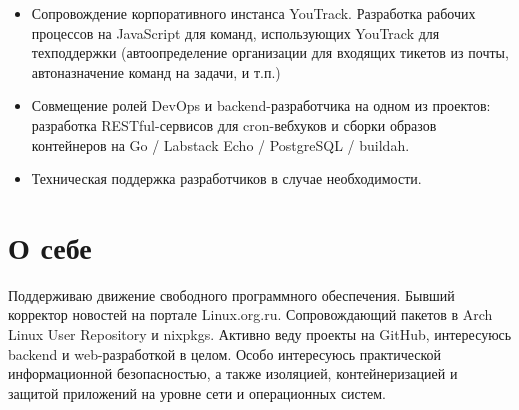 \documentclass[10pt,a4]{moderncv}
\begin{document}
{\begin{itemize}
        / Grafana) и специфичных для проектов (Logstash / Elasticsearch / Prometheus / Grafana)
        сервисов мониторинга и логгирования. Сопровождение специфичного для команд мониторинга
        (Oracle XE).
    \item
        Сопровождение корпоративного инстанса YouTrack. Разработка рабочих процессов на
        JavaScript для команд, использующих YouTrack для техподдержки (автоопределение организации
        для входящих тикетов из почты, автоназначение команд на задачи, и т.п.)
    \item
        Совмещение ролей DevOps и backend-разработчика на одном из проектов: разработка
        RESTful-сервисов для cron-вебхуков и сборки образов контейнеров на Go / Labstack Echo
        / PostgreSQL / buildah.
    \item
        Техническая поддержка разработчиков в случае необходимости.
    \end{itemize}
}

\section{О себе}
Поддерживаю движение свободного программного обеспечения. Бывший корректор новостей на
портале Linux.org.ru. Сопровождающий пакетов в Arch Linux User Repository и nixpkgs.
Активно веду проекты на GitHub, интересуюсь backend и web-разработкой в целом. Особо
интересуюсь практической информационной безопасностью, а также изоляцией, контейнеризацией
и защитой приложений на уровне сети и операционных систем.
\end{document}
